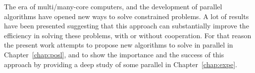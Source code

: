 The era of multi/many-core computers, and the development of parallel algorithms have opened new ways to solve constrained problems. A lot of results have been presented suggesting that this approach can substantially improve the efficiency in solving these problems, with or without cooperation. For that reason the present work attempts to propose new algorithms to solve \CSPs{} in parallel in Chapter~\ref{chap:posl}, and to show the importance and the success of this approach by providing a deep study of some parallel \comstrs{} in Chapter~\ref{chap:expe}.

